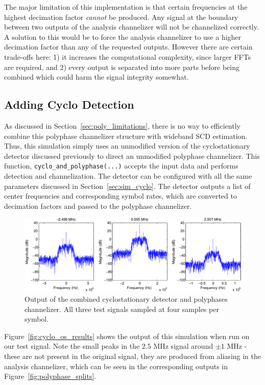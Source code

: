 \documentclass[12pt]{report}
\begin{document}
The major limitation of this implementation is that certain frequencies
at the highest decimation factor \emph{cannot} be produced. Any signal at the
boundary between two outputs of the analysis channelizer will not be
channelized correctly. A solution to this would be to force the analysis
channelizer to use a higher decimation factor than any of the requested outputs.
However there are certain trade-offs here: 1) it increases the computational
complexity, since larger FFTs are required, and 2) every output is separated
into more parts before being combined which could harm the signal integrity
somewhat.

\subsection{Adding Cyclo Detection}
\label{sec:sim_poly_cyclo}
As discussed in Section~\ref{sec:poly_limitations}, there is no way to
efficiently combine this polyphase channelizer structure with wideband SCD
estimation.  Thus, this simulation simply uses an unmodified version of the
cyclostationary detector discussed previously to direct an unmodified polyphase
channelizer. This function, \texttt{cyclo\_and\_polyphase(...)} accepts the input
data and performs detection and channelization. The detector can be configured
with all the same parameters discussed in Section~\ref{sec:sim_cyclo}. The
detector outputs a list of center frequencies and corresponding symbol rates,
which are converted to decimation factors and passed to the polyphase
channelizer.

\begin{figure}[bh!]
    \includegraphics[width=\textwidth]{cyclo_poly_results}%
\caption{Output of the combined cyclostationary detector and polyphases channelizer. All three test signals sampled at four samples per symbol.}
\label{fig:cyclo_poly_results}
\end{figure}

Figure~\ref{fig:cyclo_os_results} shows the output of this simulation when run
on our test signal. Note the small peaks in the $2.5$ MHz signal around $\pm1$
MHz - these are not present in the original signal, they are produced from
aliasing in the analysis channelizer, which can be seen in the corresponding
outputs in Figure~\ref{fig:polyphase_splits}.
\end{document}

